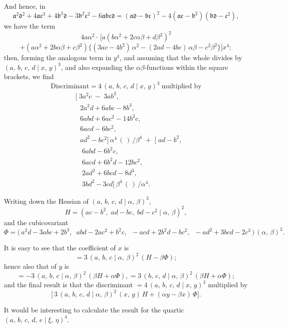 \documentclass[11pt]{article}
\begin{document}
And hence, in
\[
   \mathfrak{a}^2\mathfrak{d}^2 + 4\mathfrak{a}\mathfrak{c}^3 + 4\mathfrak{b}^3\mathfrak{d} - 3\mathfrak{b}^2\mathfrak{c}^2 - 6\mathfrak{a}\mathfrak{b}\mathfrak{c}\mathfrak{d} = (\mathfrak{a}\mathfrak{d} - \mathfrak{b}\mathfrak{c})^2 - 4(\mathfrak{a}\mathfrak{c} - \mathfrak{b}^2)(\mathfrak{b}\mathfrak{d} - \mathfrak{c}^2),
\]
we have the term
\[
   4 a\alpha^2\cdot\, [a(b\alpha^2 + 2c\alpha\beta + d\beta^2)^2
\]
\[
   + (a\alpha^2 + 2b\alpha\beta + c\beta^2)\bigl\{(3ac - 4b^2)\,\alpha^2 - (2ad - 4bc)\,\alpha\beta - c^2\beta^2\bigr\}\bigr] x^4;
\]
then, forming the analogous term in $y^4$, and assuming that the whole divides by
$(a,\,b,\,c,\,d \mid x,\,y)^3$, and also expanding the $\alpha\beta$-functions within the square brackets, we
find
\[
   \mathrm{Discriminant} = 4\,(a,\,b,\,c,\,d \mid x,\,y)^3 \;\text{multiplied by}
\]
\[
\begin{aligned}
&\bigl[\;3a^2 c\;-\;3ab^2,\\
&\;\;\,2a^2 d + 6abc - 8b^3,\\
&\;\;\,6abd + 6ac^2 - 14b^2 c,\\
&\;\;\,6acd - 6bc^2,\\
&\;\;\,ad^2 - bc^2\bigr]\,\alpha^4\,(\,)\,/\beta^4
\;+\;\bigl[\;ad - b^2,\\
&\quad 6abd - 6b^2 c,\\
&\quad 6acd + 6b^2 d - 12bc^2,\\
&\quad 2ad^2 + 6bcd - 8d^3,\\
&\quad 3bd^2 - 3cd\bigr]\,\beta^4\,(\,)\,/\alpha^4.
\end{aligned}
\]

Writing down the Hessian of $(a,\,b,\,c,\,d \mid \alpha,\,\beta)^3$,
\[
   H = (ac - b^2,\;ad - bc,\;bd - c^2 \mid \alpha,\,\beta)^2,
\]
and the cubicovariant
\[
   \Phi = \bigl(\,a^2 d - 3abc + 2b^3,\;\;abd - 2ac^2 + b^2 c,\;\;-acd + 2b^2 d - bc^2,\;\;-ad^2 + 3bcd - 2c^3\,\bigr)\,(\alpha,\,\beta)^3.
\]

It is easy to see that the coefficient of $x$ is
\[
   = 3\,(a,\,b,\,c \mid \alpha,\,\beta)^2\,(H - \beta \Phi);
\]
hence also that of $y$ is
\[
   = -3\,(a,\,b,\,c \mid \alpha,\,\beta)^2\,(\beta H + \alpha \Phi),
   = 3\,(b,\,c,\,d \mid \alpha,\,\beta)^2\,(\beta H + \alpha \Phi);
\]
and the final result is that the discriminant $= 4\,(a,\,b,\,c,\,d \mid x,\,y)^3$ multiplied by
\[
   \bigl[\,3\,(a,\,b,\,c,\,d \mid \alpha,\,\beta)^2\,(x,\,y)\,H + (\alpha y - \beta x)\,\Phi\bigr].
\]

It would be interesting to calculate the result for the quartic $(a,\,b,\,c,\,d,\,e \mid \xi,\,\eta)^4$.
\end{document}
